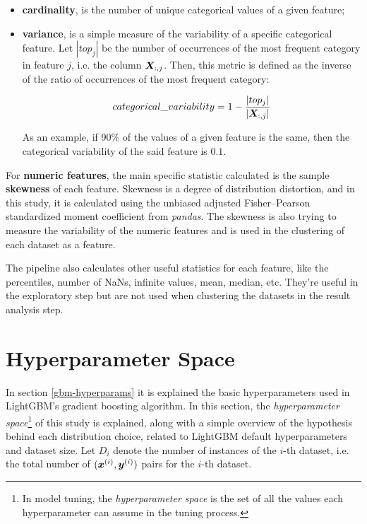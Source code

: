 \begin{itemize}
    \item \textbf{cardinality}, is the number of unique categorical values of a given feature;
    \item \textbf{variance}, is  a simple measure of the variability of a specific categorical feature.
    Let $|top_{j}|$ be the number of occurrences of the most frequent category in feature $j$, i.e. the column $\bm{X}_{:, j}$. Then, this metric is defined as the inverse of the ratio of occurrences of the most frequent category:

    $$categorical\_variability=1 - \frac{|top_{j}|}{|\bm{X}_{:, j}|}$$

    As an example, if 90\% of the values of a given feature is the same, then the categorical variability of the said feature is $0.1$.
\end{itemize}

For \textbf{numeric features}, the main specific statistic calculated is the sample \textbf{skewness} of each feature. Skewness is a degree of distribution distortion, and in this study, it is calculated using the unbiased adjusted Fisher–Pearson standardized moment coefficient from \textit{pandas}. The skewness is also trying to measure the variability of the numeric features and is used in the clustering of each dataset as a feature.

The pipeline also calculates other useful statistics for each feature, like the percentiles, number of NaNs, infinite values, mean, median, etc. They're useful in the exploratory step but are not used when clustering the datasets in the result analysis step.

\section{Hyperparameter Space}
\label{sec:hyperparam-space}

In section \ref{gbm-hyperparams} it is explained the basic hyperparameters used in LightGBM's gradient boosting algorithm. In this section, the \textit{hyperparameter space}\footnote{In model tuning, the \textit{hyperparameter space} is the set of all the values each hyperparameter can assume in the tuning process.} of this study is explained, along with a simple overview of the hypothesis behind each distribution choice, related to LightGBM default hyperparameters and dataset size.  Let $D_i$ denote the number of instances of the $i$-th dataset, i.e. the total number of $(\bm{x}^{(i)},\bm{y}^{(i)})$ pairs for the $i$-th dataset. 

